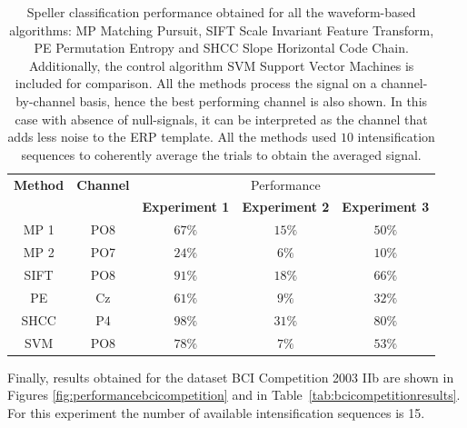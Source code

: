\begin{table}[h!]
\caption[Pseudo-real Dataset Speller Performance]{Speller classification performance obtained for all the waveform-based algorithms: MP Matching Pursuit, SIFT Scale Invariant Feature Transform, PE Permutation Entropy and SHCC Slope Horizontal Code Chain. Additionally, the control algorithm SVM Support Vector Machines is included for comparison.  All the methods process the signal on a channel-by-channel basis, hence the best performing channel is also shown. In this case with absence of null-signals, it can be interpreted as the channel that adds less noise to the ERP template.  All the methods used $10$ intensification sequences to coherently average the trials to obtain the averaged signal. }
\centering
\begin{tabular}{ccccc}
\toprule
\textbf{Method}	& \textbf{Channel} &   \multicolumn{3}{c}{Performance} \\
 	&  &  \textbf{Experiment 1} & \textbf{Experiment 2}	& \textbf{Experiment 3}\\
\midrule
MP 1 & PO8  & $67\%$ & $15\%$ & $50\%$\\
MP 2 & PO7 & $24\%$ & $6\%$ & $10\%$\\
SIFT  & PO8 & $91\%$ & $18\%$ & $66\%$\\
PE     & Cz & $61\%$ & $9\%$ & $32\%$\\
SHCC & P4 & $98\%$ & $31\%$ & $80\%$\\
SVM     & PO8  & $78\%$ & $7\%$ & $53\%$\\
\bottomrule
\end{tabular}
\label{tab:results}
\end{table}

Finally, results obtained for the dataset BCI Competition 2003 IIb are shown in Figures \ref{fig:performancebcicompetition} and in Table~\ref{tab:bcicompetitionresults}.  For this experiment the number of available intensification sequences is 15.

